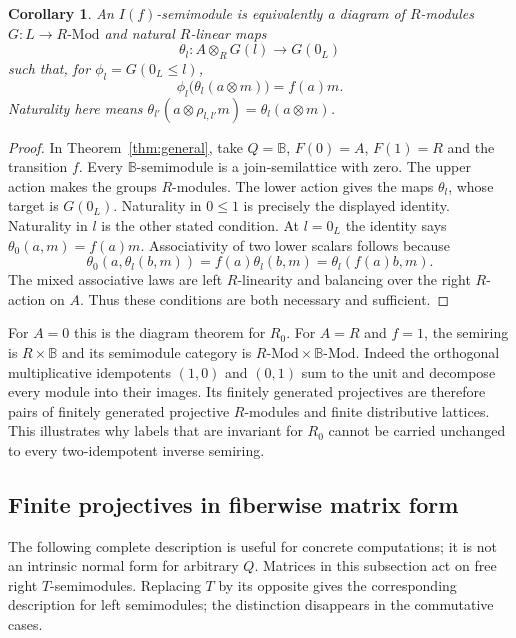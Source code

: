 \documentclass[11pt]{amsart}
\newcommand{\B}{\mathbb B}
\newcommand{\Mod}{\mathrm{Mod}}
\newtheorem{corollary}[theorem]{Corollary}
\theoremstyle{definition}
\theoremstyle{remark}
\begin{document}
\begin{corollary}\label{cor:two}
An $I(f)$-semimodule is equivalently a diagram of $R$-modules $G:L\to R\text{-}\Mod$ and natural $R$-linear maps
\[
 \theta_l:A\otimes_R G(l)\longrightarrow G(0_L)
\]
such that, for $\phi_l=G(0_L\le l)$,
\[
 \phi_l\bigl(\theta_l(a\otimes m)\bigr)=f(a)m.
\]
Naturality here means $\theta_{l'}(a\otimes\rho_{l,l'}m)=\theta_l(a\otimes m)$.
\end{corollary}
\begin{proof}
In Theorem~\ref{thm:general}, take $Q=\B$, $F(0)=A$, $F(1)=R$ and the transition $f$. Every $\B$-semimodule is a join-semilattice with zero. The upper action makes the groups $R$-modules. The lower action gives the maps $\theta_l$, whose target is $G(0_L)$. Naturality in $0\le1$ is precisely the displayed identity. Naturality in $l$ is the other stated condition. At $l=0_L$ the identity says $\theta_0(a,m)=f(a)m$. Associativity of two lower scalars follows because
\[
 \theta_0(a,\theta_l(b,m))=f(a)\theta_l(b,m)
 =\theta_l(f(a)b,m).
\]
The mixed associative laws are left $R$-linearity and balancing over the right $R$-action on $A$. Thus these conditions are both necessary and sufficient.
\end{proof}

For $A=0$ this is the diagram theorem for $R_0$. For $A=R$ and $f=1$, the semiring is $R\times\B$ and its semimodule category is $R\text{-}\Mod\times\B\text{-}\Mod$. Indeed the orthogonal multiplicative idempotents $(1,0)$ and $(0,1)$ sum to the unit and decompose every module into their images. Its finitely generated projectives are therefore pairs of finitely generated projective $R$-modules and finite distributive lattices. This illustrates why labels that are invariant for $R_0$ cannot be carried unchanged to every two-idempotent inverse semiring.

\subsection{Finite projectives in fiberwise matrix form}
The following complete description is useful for concrete computations; it is not an intrinsic normal form for arbitrary $Q$. Matrices in this subsection act on free right $T$-semimodules. Replacing $T$ by its opposite gives the corresponding description for left semimodules; the distinction disappears in the commutative cases.
\end{document}
